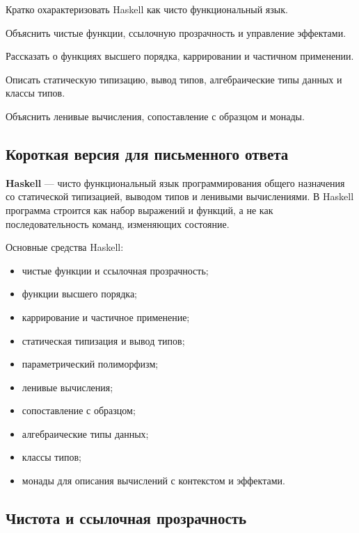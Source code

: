 
\begin{examplan}
    \item Кратко охарактеризовать Haskell как чисто функциональный язык.
    \item Объяснить чистые функции, ссылочную прозрачность и управление эффектами.
    \item Рассказать о функциях высшего порядка, каррировании и частичном применении.
    \item Описать статическую типизацию, вывод типов, алгебраические типы данных и классы типов.
    \item Объяснить ленивые вычисления, сопоставление с образцом и монады.
\end{examplan}

\subsection*{Короткая версия для письменного ответа}

\textbf{Haskell} --- чисто функциональный язык программирования общего назначения со статической типизацией, выводом типов и ленивыми вычислениями. В Haskell программа строится как набор выражений и функций, а не как последовательность команд, изменяющих состояние.

Основные средства Haskell:
\begin{itemize}
    \item чистые функции и ссылочная прозрачность;
    \item функции высшего порядка;
    \item каррирование и частичное применение;
    \item статическая типизация и вывод типов;
    \item параметрический полиморфизм;
    \item ленивые вычисления;
    \item сопоставление с образцом;
    \item алгебраические типы данных;
    \item классы типов;
    \item монады для описания вычислений с контекстом и эффектами.
\end{itemize}

\subsection*{Чистота и ссылочная прозрачность}

